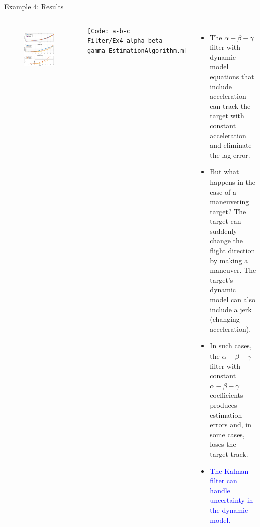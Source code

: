 \begin{frame}{Example 4: Results}
\begin{columns}
    \begin{figure}
	    \centering
	    \includegraphics[width=0.9\textwidth]{Figures/Chapter1/ex4_estimationAlgorithm.eps}
	    \label{fig:ex4_estimationAlgorithm}
	\end{figure}
	\texttt{\tiny [Code: a-b-c Filter/Ex4\_alpha-beta-gamma\_EstimationAlgorithm.m]}
    \begin{itemize}
        \item The $\alpha-\beta-\gamma$ filter with dynamic model equations that include acceleration can track the target with constant acceleration and eliminate the lag error.
        \item But what happens in the case of a maneuvering target? The target can suddenly change the flight direction by making a maneuver. The target's dynamic model can also include a jerk (changing acceleration). 
        \item In such cases, the $\alpha-\beta-\gamma$  filter with constant $\alpha-\beta-\gamma$ coefficients produces estimation errors and, in some cases, loses the target track.
        \item \textcolor{blue}{The Kalman filter can handle uncertainty in the dynamic model.}
    \end{itemize}
\end{columns}    
\end{frame}
